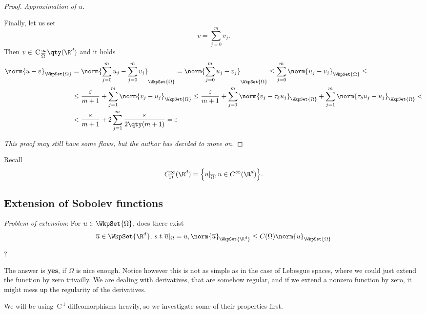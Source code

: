 \begin{proof}
\textit{Approximation of $u$.}

Finally, let us set
\[
	v = \sum_{j=0}^m v_j.
\]
Then $v \in \, \text{C} \,^{\infty}_{\overline{\Omega}}\qty(\R^{d})$ and it holds
\begin{align*}
	\norm{u-v}_{\WkpSet{\Omega}} &= \norm{\sum_{j=0}^m u_j- \sum_{j=0}^m v_j}_{\WkpSet{\Omega}} = \norm{\sum_{j=0}^m u_j - v_j}_{\WkpSet{\Omega}} \leq \sum_{j=0}^m \norm{u_j - v_j}_{\WkpSet{\Omega}} \leq \\
	& \leq \frac{\varepsilon}{m+1} + \sum_{j=1}^m \norm{v_j-u_j}_{\WkpSet{\Omega}} \leq \frac{\varepsilon}{m+1} + \sum_{j=1}^m \norm{v_j - \tau_{\delta}u_j}_{\WkpSet{\Omega}} + \sum_{j=1}^m \norm{\tau_{\delta}u_j - u_j}_{\WkpSet{\Omega}} < \\
	&< \frac{\varepsilon}{m+1} +  2\sum_{j=1}^m \frac{\varepsilon}{2\qty(m+1)}  = \varepsilon
\end{align*}

\textit{This proof may still have some flaws, but the author has decided to move on.}
\end{proof}	

\begin{remark}
	Recall
	\[
		C^\infty_{\overline{\Omega}}(\R^d) = \Big\{u|_{\overline{\Omega}}, u \in C^{\infty}(\R^d) \Big\}.
	\]
\end{remark}



\subsection{Extension of Sobolev functions}
\label{sec:extension}

\textit{Problem of extension}: For $u \in \WkpSet{\Omega}$, does there exist
\[
	\overline{u} \in \WkpSet{\R^d}, \, \text{\textit{s.t.}} \,\overline{u}|_{\Omega}=u, \norm{\overline{u}}_{\WkpSet{\R^d}} \leq C(\Omega) \norm{u}_{\WkpSet{\Omega}}
\]

?

The answer is \textbf{yes}, if $\Omega$ is nice enough. Notice however this is not as simple as in the case of Lebesgue spaces, where we could just extend the function by zero trivailly. We are dealing with derivatives, that are somehow regular, and if we extend a nonzero function by zero, it might mess up the regularity of the derivatives.

We will be using $\, \text{C} \,^1$ diffeomorphisms heavily, so we investigate some of their properties first.


